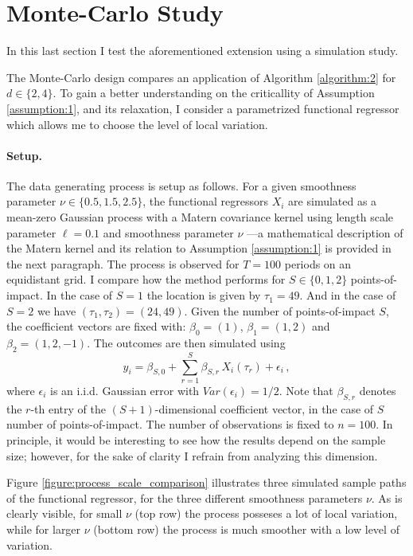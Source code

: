 \section{Monte-Carlo Study}
\label{section:monte_carlo}

In this last section I test the aforementioned extension using a simulation study.

The Monte-Carlo design compares an application of Algorithm \ref{algorithm:2} for $d \in
\{2, 4\}$. To gain a better understanding on the criticallity of Assumption
\ref{assumption:1}, and its relaxation, I consider a parametrized functional regressor
which allows me to choose the level of local variation.

\paragraph{Setup.}

The data generating process is setup as follows. For a given smoothness parameter $\nu
\in \{0.5, 1.5, 2.5\}$, the functional regressors $X_i$ are simulated as a mean-zero
Gaussian process with a Matern covariance kernel using length scale parameter $\ell =
0.1$ and smoothness parameter $\nu$ ---a mathematical description of the Matern kernel
and its relation to Assumption \ref{assumption:1} is provided in the next paragraph. The
process is observed for $T=100$ periods on an equidistant grid. I compare how the method
performs for $S \in \{0, 1, 2\}$ points-of-impact. In the case of $S = 1$ the location
is given by $\tau_1 = 49$. And in the case of $S = 2$ we have $(\tau_1, \tau_2) = (24,
49)$.  Given the number of points-of-impact $S$, the coefficient vectors are fixed
with: $\beta_0 = (1)$, $\beta_1 = (1, 2)$ and $\beta_2 = (1, 2, -1)$. The outcomes are
then simulated using
\[
    y_i = \beta_{S, 0} + \sum_{r = 1}^S \beta_{S, r} \, X_i(\tau_r) + \epsilon_i \,,
\]
where $\epsilon_i$ is an i.i.d. Gaussian error with $Var(\epsilon_i) = 1/2$. Note that
$\beta_{S, r}$ denotes the $r$-th entry of the $(S+1)$-dimensional coefficient vector,
in the case of $S$ number of points-of-impact. The number of observations is fixed to $n
= 100$. In principle, it would be interesting to see how the results depend on the
sample size; however, for the sake of clarity I refrain from analyzing this dimension.

Figure \ref{figure:process_scale_comparison} illustrates three simulated sample paths of
the functional regressor, for the three different smoothness parameters $\nu$. As is
clearly visible, for small $\nu$ (top row) the process posseses a lot of local
variation, while for larger $\nu$ (bottom row) the process is much smoother with a low
level of variation.


